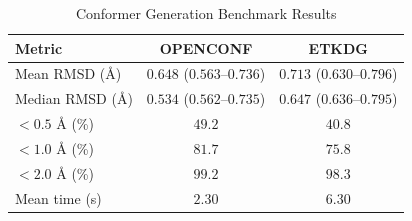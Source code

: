 \begin{table}[htbp]
\centering
\caption{Conformer Generation Benchmark Results}
\label{tab:benchmark}
\begin{tabular}{lcc}
\toprule
Metric & OPENCONF & ETKDG \\
\midrule
Mean RMSD (Å) & $0.648$ ($0.563$--$0.736$) & $0.713$ ($0.630$--$0.796$) \\
Median RMSD (Å) & $0.534$ ($0.562$--$0.735$) & $0.647$ ($0.636$--$0.795$) \\
$<0.5$ Å (\%) & $49.2$ & $40.8$ \\
$<1.0$ Å (\%) & $81.7$ & $75.8$ \\
$<2.0$ Å (\%) & $99.2$ & $98.3$ \\
\midrule
Mean time (s) & $2.30$ & $6.30$ \\
\bottomrule
\end{tabular}
\end{table}
